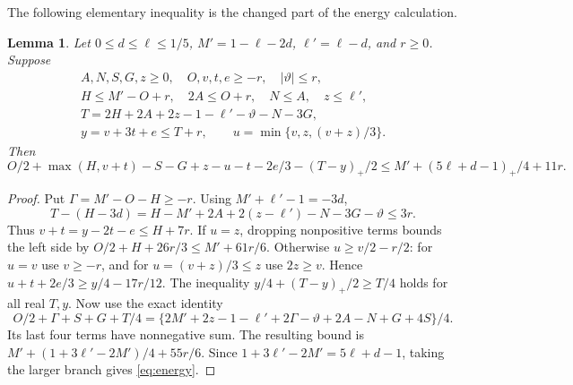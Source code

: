 \documentclass[12pt]{article}
\newtheorem{lemma}[theorem]{Lemma}
\begin{document}
The following elementary inequality is the changed part of the
energy calculation.
\begin{lemma}\label{lem:energy}
Let \(0\le d\le\ell\le1/5\), \(M'=1-\ell-2d\),
\(\ell'=\ell-d\), and \(r\ge0\).  Suppose
\[
\begin{gathered}
 A,N,S,G,z\ge0,\quad O,v,t,e\ge-r,\quad|\vartheta|\le r,\\
 H\le M'-O+r,\quad 2A\le O+r,\quad N\le A,\quad z\le\ell',\\
 T=2H+2A+2z-1-\ell'-\vartheta-N-3G,\\
 y=v+3t+e\le T+r,\qquad u=\min\{v,z,(v+z)/3\}.
\end{gathered}
\]
Then
\begin{equation}\label{eq:energy}
 O/2+\max(H,v+t)-S-G+z-u-t-2e/3-(T-y)_+/2
 \le M'+(5\ell+d-1)_+/4+11r.
\end{equation}
\end{lemma}
\begin{proof}
Put \(\Gamma=M'-O-H\ge-r\).  Using \(M'+\ell'-1=-3d\),
\[
 T-(H-3d)=H-M'+2A+2(z-\ell')-N-3G-\vartheta\le3r.
\]
Thus \(v+t=y-2t-e\le H+7r\).
If \(u=z\), dropping nonpositive terms bounds the left side by
\(O/2+H+26r/3\le M'+61r/6\).
Otherwise \(u\ge v/2-r/2\): for \(u=v\) use \(v\ge-r\),
and for \(u=(v+z)/3\le z\) use \(2z\ge v\).
Hence \(u+t+2e/3\ge y/4-17r/12\).
The inequality \(y/4+(T-y)_+/2\ge T/4\) holds for all real
\(T,y\).  Now use the exact identity
\[
 O/2+\Gamma+S+G+T/4
 =\{2M'+2z-1-\ell'+2\Gamma-\vartheta+2A-N+G+4S\}/4.
\]
Its last four terms have nonnegative sum.  The resulting bound is
\(M'+(1+3\ell'-2M')/4+55r/6\).
Since \(1+3\ell'-2M'=5\ell+d-1\), taking the larger branch gives
\eqref{eq:energy}.
\end{proof}
\end{document}
